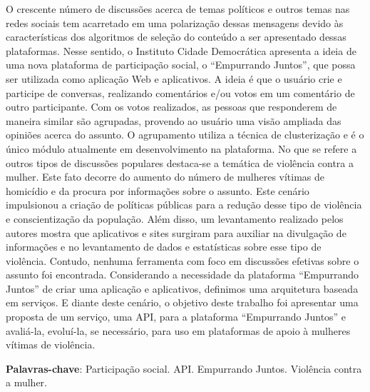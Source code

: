 \begin{resumo}
O crescente número de discussões acerca de temas políticos e outros temas nas redes sociais tem acarretado em uma polarização 
dessas mensagens devido às características dos algoritmos de seleção do conteúdo a ser apresentado dessas plataformas. Nesse sentido, o Instituto Cidade Democrática 
apresenta a ideia de uma nova plataforma de participação social, o ``Empurrando Juntos'', que possa ser utilizada como aplicação Web e aplicativos. A ideia é que o 
usuário crie e participe de conversas, realizando comentários e/ou votos em um comentário de outro participante. Com os votos realizados, as pessoas que 
responderem de maneira similar são agrupadas, provendo ao usuário uma visão ampliada das opiniões acerca do assunto. O agrupamento utiliza a técnica de 
clusterização e é o único módulo atualmente em desenvolvimento na plataforma. No que se refere a outros tipos de discussões populares  destaca-se a temática de violência 
contra a mulher. Este fato decorre do aumento do número de mulheres vítimas de homicídio e da procura por informações sobre o assunto. Este cenário impulsionou a 
criação de políticas públicas para a redução desse tipo de violência e conscientização da população. Além disso, um levantamento realizado pelos autores 
mostra que aplicativos e sites surgiram para auxiliar na divulgação de informações e no levantamento de dados e estatísticas sobre esse tipo de violência. Contudo, nenhuma ferramenta com foco 
em discussões efetivas sobre o assunto foi encontrada. Considerando a necessidade da plataforma ``Empurrando Juntos'' de criar uma aplicação e aplicativos, 
definimos uma arquitetura baseada em serviços. E diante deste cenário, o objetivo deste trabalho foi apresentar uma proposta de um serviço, uma API, para a plataforma 
``Empurrando Juntos'' e avaliá-la, evoluí-la, se necessário, para uso em plataformas de apoio à mulheres vítimas de violência. 
\vspace{\onelineskip}
  
\noindent
\textbf{Palavras-chave}: Participação social. API. Empurrando Juntos. Violência contra a mulher.
\end{resumo}
